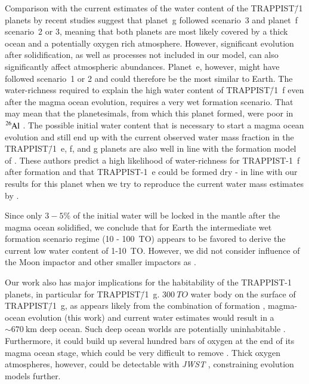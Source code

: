 \documentclass[oneside,twocolumn]{article}
\newcommand{\eg}{e.g. }
\begin{document}
Comparison with the current estimates of the water content of the TRAPPIST\=/1 planets by recent studies \citep{Noack2016,barr2018interior,Dorn2018,Unterborn2018b} suggest that planet~g followed scenario~3 and planet~f scenario~2 or 3, meaning that both planets are most likely covered by a thick ocean and a potentially oxygen rich atmosphere. However, significant evolution after solidification, as well as processes not included in our model, can also significantly affect atmospheric abundances. Planet~e, however, might have followed scenario~1 or 2 and could therefore be the most similar to Earth. 
The water-richness required to explain the high water content of TRAPPIST\=/1~f even after the magma ocean evolution, requires a very wet formation scenario. 
That may mean that the planetesimals, from which this planet formed, were poor in $\ce{^{26}Al}$ \citep{Lichtenberg2019}. The possible initial water content that is necessary to start a magma ocean evolution and still end up with the current observed water mass fraction in the TRAPPIST\=/1~e, f, and g planets are also well in line with the formation model of \citet{Miguel2020}. These authors predict a high likelihood of water-richness for TRAPPIST-1~f after formation and that TRAPPIST-1~e could be formed dry - in line with our results for this planet when we try to reproduce the current water mass estimates by \citet{Dorn2018}.

Since only $3-5\%$ of the initial water will be locked in the mantle after the magma ocean solidified, we conclude that for Earth the intermediate wet formation scenario regime (10 - \SI{100}{TO}) appears to be favored to derive the current low water content of 1-\SI{10}{TO}. However, we did not consider influence of the Moon impactor and other smaller impactors as \citet{zahnle2019}. 

Our work also has major implications for the habitability of the TRAPPIST-1 planets, in particular for TRAPPIST\=/1~g. $\SI{300}{TO}$ water body on the surface of TRAPPIST\=/1~g, as appears likely from the combination of formation \citep{Miguel2020}, magma-ocean evolution (this work) and current water estimates \citep{Dorn2018,Unterborn2018} would result in a $\sim \SI{670}{\kilo\metre}$ deep ocean. Such deep ocean worlds are potentially uninhabitable \citep[\eg][]{Noack2016}. Furthermore, it could build up several hundred bars of oxygen at the end of its magma ocean stage, which could be very difficult to remove \citep{lingam2020}. Thick oxygen atmospheres, however, could be detectable with \textit{JWST} \citep{Lincowski2018}, constraining evolution models further.
\end{document}
